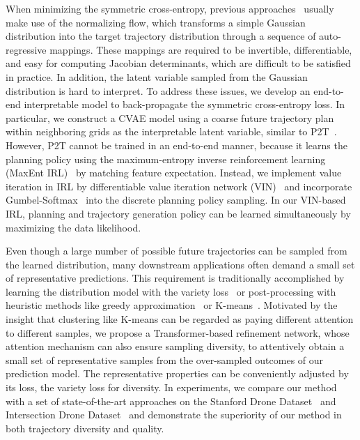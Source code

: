 \documentclass[10pt,twocolumn,letterpaper]{article}
\begin{document}
When minimizing the symmetric cross-entropy, previous approaches~\cite{rhinehart2018r2p2,park2020diverse} usually make use of the normalizing flow, which transforms a simple Gaussian distribution into the target trajectory distribution through a sequence of auto-regressive mappings. These mappings are required to be invertible, differentiable, and easy for computing Jacobian determinants, which are difficult to be satisfied in practice. In addition, the latent variable sampled from the Gaussian distribution is hard to interpret. To address these issues, we develop an end-to-end interpretable model to back-propagate the symmetric cross-entropy loss. In particular, we construct a CVAE model using a coarse future trajectory plan within neighboring grids as the interpretable latent variable, similar to P2T~\cite{deo2020trajectory}. However, P2T cannot be trained in an end-to-end manner, because it learns the planning policy using the maximum-entropy inverse reinforcement learning (MaxEnt IRL)~\cite{ziebart2008maximum,wulfmeier2017large} by matching feature expectation. Instead, we implement value iteration in IRL by differentiable value iteration network (VIN)~\cite{2016Value} and incorporate Gumbel-Softmax~\cite{jang2017categorical} into the discrete planning policy sampling. In our VIN-based IRL, planning and trajectory generation policy can be learned simultaneously by maximizing the data likelihood. 

Even though a large number of possible future trajectories can be sampled from the learned distribution, many downstream applications often demand a small set of representative predictions. This requirement is traditionally accomplished by learning the distribution model with the variety loss~\cite{gupta2018social,huang2019stgat,dendorfer2020goal} or post-processing with heuristic methods like greedy approximation~\cite{phan2020covernet} or K-means~\cite{deo2020trajectory,deo2021multimodal}. Motivated by the insight that clustering like K-means can be regarded as paying different attention to different samples, we propose a Transformer-based refinement network, whose attention mechanism can also ensure sampling diversity, to attentively obtain a small set of representative samples from the over-sampled outcomes of our prediction model.
The representative properties can be conveniently adjusted by its loss, \eg the variety loss for diversity. In experiments, we compare our method with a set of state-of-the-art approaches on the Stanford Drone Dataset~\cite{robicquet2016learning} and Intersection Drone Dataset~\cite{inDdataset} and demonstrate the superiority of our method in both trajectory diversity and quality.
\end{document}
